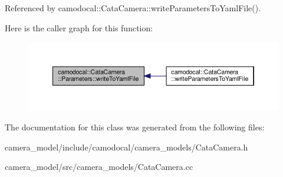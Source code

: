 Referenced by camodocal\+::\+Cata\+Camera\+::write\+Parameters\+To\+Yaml\+File().

Here is the caller graph for this function\+:\nopagebreak
\begin{figure}[H]
\begin{center}
\leavevmode
\includegraphics[width=350pt]{classcamodocal_1_1CataCamera_1_1Parameters_a9bd3a31bc31a3f4e1becfbd2bbb43331_icgraph}
\end{center}
\end{figure}


The documentation for this class was generated from the following files\+:\begin{DoxyCompactItemize}
\item 
camera\+\_\+model/include/camodocal/camera\+\_\+models/Cata\+Camera.\+h\item 
camera\+\_\+model/src/camera\+\_\+models/Cata\+Camera.\+cc\end{DoxyCompactItemize}
